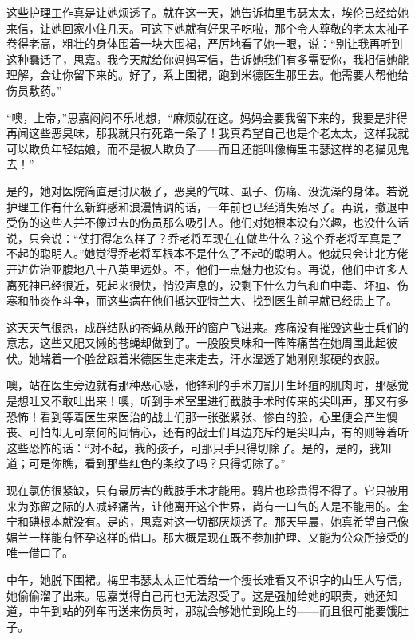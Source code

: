 \par 这些护理工作真是让她烦透了。就在这一天，她告诉梅里韦瑟太太，埃伦已经给她来信，让她回家小住几天。可这下她就有好果子吃啦，那个令人尊敬的老太太袖子卷得老高，粗壮的身体围着一块大围裙，严厉地看了她一眼，说：“别让我再听到这种蠢话了，思嘉。我今天就给你妈妈写信，告诉她我们有多需要你，我相信她能理解，会让你留下来的。好了，系上围裙，跑到米德医生那里去。他需要人帮他给伤员敷药。”
\par “噢，上帝，”思嘉闷闷不乐地想，“麻烦就在这。妈妈会要我留下来的，我要是非得再闻这些恶臭味，那我就只有死路一条了！我真希望自己也是个老太太，这样我就可以欺负年轻姑娘，而不是被人欺负了——而且还能叫像梅里韦瑟这样的老猫见鬼去！”
\par 是的，她对医院简直是讨厌极了，恶臭的气味、虱子、伤痛、没洗澡的身体。若说护理工作有什么新鲜感和浪漫情调的话，一年前也已经消失殆尽了。再说，撤退中受伤的这些人并不像过去的伤员那么吸引人。他们对她根本没有兴趣，也没什么话说，只会说：“仗打得怎么样了？乔老将军现在在做些什么？这个乔老将军真是了不起的聪明人。”她觉得乔老将军根本不是什么了不起的聪明人。他就只会让北方佬开进佐治亚腹地八十八英里远处。不，他们一点魅力也没有。再说，他们中许多人离死神已经很近，死起来很快，悄没声息的，没剩下什么力气和血中毒、坏疽、伤寒和肺炎作斗争，而这些病在他们抵达亚特兰大、找到医生前早就已经患上了。
\par 这天天气很热，成群结队的苍蝇从敞开的窗户飞进来。疼痛没有摧毁这些士兵们的意志，这些又肥又懒的苍蝇却做到了。一股股臭味和一阵阵痛苦在她周围此起彼伏。她端着一个脸盆跟着米德医生走来走去，汗水湿透了她刚刚浆硬的衣服。
\par 噢，站在医生旁边就有那种恶心感，他锋利的手术刀割开生坏疽的肌肉时，那感觉是想吐又不敢吐出来！噢，听到手术室里进行截肢手术时传来的尖叫声，那又有多恐怖！看到等着医生来医治的战士们那一张张紧张、惨白的脸，心里便会产生懊丧、可怕却无可奈何的同情心，还有的战士们耳边充斥的是尖叫声，有的则等着听这些恐怖的话：“对不起，我的孩子，可那只手只得切除了。是的，是的，我知道；可是你瞧，看到那些红色的条纹了吗？只得切除了。”
\par 现在氯仿很紧缺，只有最厉害的截肢手术才能用。鸦片也珍贵得不得了。它只被用来为弥留之际的人减轻痛苦，让他离开这个世界，尚有一口气的人是不能用的。奎宁和碘根本就没有。是的，思嘉对这一切都厌烦透了。那天早晨，她真希望自己像媚兰一样能有怀孕这样的借口。那大概是现在既不参加护理、又能为公众所接受的唯一借口了。
\par 中午，她脱下围裙。梅里韦瑟太太正忙着给一个瘦长难看又不识字的山里人写信，她偷偷溜了出来。思嘉觉得自己再也无法忍受了。这是强加给她的职责，她还知道，中午到站的列车再送来伤员时，那就会够她忙到晚上的——而且很可能要饿肚子。
